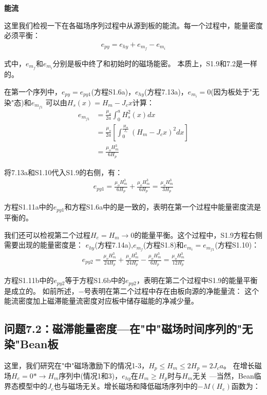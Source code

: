\textbf{能流}

这里我们检视一下在各磁场序列过程中从源到板的能流。每一个过程中，能量密度必须平衡：
\begin{align*}%
e_{py}=e_{hy}+e_{m_f}-e_{m_i} \tag{S1.9}
\end{align*}

式中，$e_{m_f}$和$e_{m_i}$分别是板中终了和初始时的磁场能密。
本质上，S1.9和7.2是一样的。

在第一个序列中，$e_{py}=e_{py1}$(方程S1.6a)，$e_{hy}$(方程7.13a)，$e_{m_i}=0$(因为板处于"无染"态)和$e_{m_{f1}}$
可以由$H_s(x)=H_m-J_c x$计算：
\begin{align*}%
e_{m_{f1}}&=\frac{\mu_o}{2a}\int_{0}^{a}H_{s}^{2}(x)dx \\
&=\frac{\mu_o}{2a}\left[\int_{0}^{\frac{H_m}{J_c}}(H_m-J_cx)^2dx\right]\\
&=\frac{\mu_oH_{m}^{3}}{6H_p} \tag{S1.10}
\end{align*}

将7.13a和S1.10代入S1.9的右侧，有：
\begin{align*}%
e_{py1}=\frac{\mu_oH_{m}^{3}}{6H_p}+\frac{\mu_oH_{m}^{3}}{6H_p}=\frac{\mu_oH_{m}^{3}}{3H_p} \tag{S1.11a}
\end{align*}

方程S1.11a中的$e_{py1}$和方程S1.6a中的是一致的，表明在第一个过程中能量密度流是平衡的。

我们还可以检视第二个过程$H_e=H_m\rightarrow 0$的能量平衡。这个过程中，S1.9方程右侧需要出现的能量密度是：
$e_{hy}$(方程7.14a),$e_{m_f}$(方程S1.8)和$e_{m_i}=e_{m_{f1}}$(方程S1.10)：
\begin{align*}%
e_{py2}=\frac{\mu_oH_{m}^{3}}{24H_p}+\frac{\mu_oH_{m}^{3}}{24H_p}-\frac{\mu_oH_{m}^{3}}{6H_p}=\frac{\mu_oH_{m}^{3}}{12H_p} \tag{S1.11b}
\end{align*}

方程S1.11b中的$e_{py2}$等于方程S1.6b中的$e_{py2}$，表明在第二个过程中S1.9的能量平衡是成立的。
如前所述，$-$号表明在第二个过程中存在由板向源的净能量流：
这个能流密度加上磁滞能量流密度对应板中储存磁能的净减少量。


\subsection{问题7.2：磁滞能量密度---在"中"磁场时间序列的"无染"Bean板}
这里，我们研究在"中"磁场激励下的情况1-3，$H_p\le H_m\le2H_p=2J_c a$。
在增长磁场$H_e=0*\rightarrow H_m$序列中(情况1和3)，$e_{hy}$在$H_m\ge H_p$时与$H_m$无关
---当然，Bean临界态模型中的$J_c$也与磁场无关。增长磁场和降低磁场序列中的$−M(H_e)$函数为：

